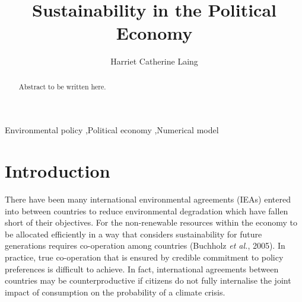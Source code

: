 \documentclass[11pt,preprint, authoryear]{elsarticle}
\numberwithin{equation}{section}
\numberwithin{figure}{section}
\numberwithin{table}{section}
\begin{document}
\begin{frontmatter}  %

\title{Sustainability in the Political Economy}





\author[Add1]{Harriet Catherine Laing}





\address[Add1]{University of Stellenbosch, South Africa}


\begin{abstract}
\small{
Abstract to be written here.
}
\end{abstract}

\vspace{1cm}


\begin{keyword}
\footnotesize{
Environmental policy \sep Political economy \sep Numerical model \\
\vspace{0.3cm}
}
\end{keyword}



\vspace{0.5cm}

\end{frontmatter}



\pagestyle{fancy}
\chead{}
\rhead{}
\lfoot{}
\lhead{}
\cfoot{}


\headsep 35pt %




\hypertarget{introduction}{%
\section{Introduction}\label{introduction}}

There have been many international environmental agreements (IEAs)
entered into between countries to reduce environmental degradation which
have fallen short of their objectives. For the non-renewable resources
within the economy to be allocated efficiently in a way that considers
sustainability for future generations requires co-operation among
countries (Buchholz \emph{et al.}, 2005). In practice, true co-operation
that is ensured by credible commitment to policy preferences is
difficult to achieve. In fact, international agreements between
countries may be counterproductive if citizens do not fully internalise
the joint impact of consumption on the probability of a climate crisis.
\end{document}

